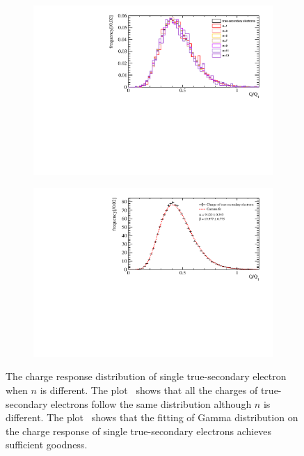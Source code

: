 \begin{figure}[ht]
    \centering
    \begin{subfigure}{0.45\textwidth}
        \centering
        \includegraphics[width=\linewidth]{pic/single_pecharge.pdf}
        \caption{}
        \label{fig:single_pe}
    \end{subfigure}
    \hfill
    \begin{subfigure}{0.45\textwidth}
        \centering
        \includegraphics[width=\linewidth]{pic/singlepefit.pdf}
        \caption{}
        \label{fig:single_fit}
    \end{subfigure}
    \caption{The charge response distribution of single true-secondary electron when $n$ is different.
        The plot~ shows that all the charges of true-secondary electrons follow the same distribution
        although $n$ is different.
        The plot~ shows that the fitting of Gamma distribution on the charge response of single true-secondary electrons
        achieves sufficient goodness.}
    \label{fig:singlepe}
\end{figure}
